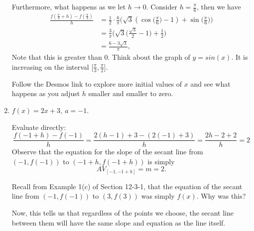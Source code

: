 \documentclass{ximera}
\begin{document}
\begin{example}
\begin{enumerate}[label=\alph*.]
\begin{explanation}
 Furthermore, what happens as we let $h \rightarrow 0$. Consider $h =\frac{\pi}{6}$, then we have 
  \begin{align*}
   \frac{f(\frac{\pi}{3} + h) - f(\frac{\pi}{3})}{h} &= \frac{1}{2} \cdot \frac{6}{\pi}\big(\sqrt{3}(\cos\Big(\frac{\pi}{6}\Big) -1) + \sin\Big(\frac{\pi}{6}\Big)\big)\\
   &= \frac{3}{\pi}\Big(\sqrt{3}\Big(\frac{\sqrt{3}}{2} -1\Big)+ \frac{1}{2}\Big)\\
   &=\frac{6-3\sqrt{3}}{\pi},
   \end{align*}
   Note that this is greater than 0. Think about the graph of $y=sin(x)$. It is increasing on the interval $\big[\frac{\pi}{3}, \frac{\pi}{2}\big]$.
   
   Follow the Desmos link to explore more initial values of $x$ and see what happens as you adjust $h$ smaller and smaller to zero.

    \end{explanation}
  
  \item $f(x) = 2x+3, \ a = -1$.\\
  \begin{explanation}
  Evaluate directly:
  \begin{equation*}
  \frac{f(-1 + h) - f(-1)}{h} = \frac{2(h-1) + 3 - (2(-1)+3)}{h} = \frac{2h-2 +2}{h} = 2 
  \end{equation*}
  Observe that the equation for the slope of the secant line from $(-1,f(-1))$ to $(-1+h,f(-1+h))$ is simply
  $$AV_{[-1,-1+h]}=  m = 2.$$
  
 Recall from Example 1(c) of Section 12-3-1, that the equation of the secant line from $(-1,f(-1))$ to $(3,f(3))$ was simply $f(x)$. Why was this?
  
Now, this tells us that regardless of the points we choose, the secant line between them will have the same slope and equation as the line itself.
  \end{explanation}
   \end{enumerate}
\end{example}
\end{document}
